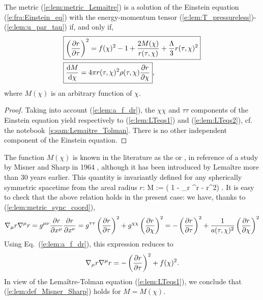 \begin{prop}
The metric (\ref{e:lem:metric_Lemaitre}) is a solution of the
Einstein equation (\ref{e:fra:Einstein_eq}) with the energy-momentum tensor (\ref{e:lem:T_pressureless})-(\ref{e:lem:u_par_tau}) if, and only if,
\begin{subequations}\label{e:lem:LTeqs}
\begin{align}
 & \fbox{$\displaystyle \left( \frac{\partial r}{\partial \tau} \right) ^2 = f(\chi)^2 - 1 + \frac{2M(\chi)}{r(\tau,\chi)}
   + \frac{\Lambda}{3} r(\tau,\chi)^2 $} \label{e:lem:LTeqs1} \\
 & \fbox{$\displaystyle \frac{\mathrm{d} M}{\mathrm{d}\chi} = 4\pi r(\tau,\chi)^2 \rho(\tau,\chi) \frac{\partial r}{\partial \chi} $} ,
    \label{e:lem:LTeqs2}
 \end{align}
\end{subequations}
where $M(\chi)$ is an arbitrary function of $\chi$.
\end{prop}
\begin{proof}
Taking into account (\ref{e:lem:a_f_dr}), the $\chi\chi$ and $\tau\tau$ components of the Einstein equation
yield respectively to (\ref{e:lem:LTeqs1}) and (\ref{e:lem:LTeqs2}), cf. the notebook~\ref{s:sam:Lemaitre_Tolman}.
There is no other independent component of the Einstein equation.
\end{proof}

The function $M(\chi)$ is known in the literature as the  or , in reference
of a study by Misner and Sharp in 1964 \cite{MisneS64}, although it has been introduced
by Lemaître \cite{Lemai32} more than 30 years earlier. This quantity is
invariantly defined for any spherically symmetric spacetime from the areal radius $r$:
\be \label{e:lem:def_Misner_Sharp}
    M  :=  \left( 1 - \nabla_\mu r \nabla^\mu r  -  r^2\right) .
\ee
It is easy to check that the above relation holds in the present case:
we have, thanks to (\ref{e:lem:metric_sync_coord}),
\[
    \nabla_\mu r \nabla^\mu r = g^{\mu\nu} \frac{\partial r}{\partial x^\mu} \frac{\partial r}{\partial x^\nu}
        = g^{\tau\tau} \left( \frac{\partial r}{\partial \tau} \right)^2
        + g^{\chi\chi} \left( \frac{\partial r}{\partial \chi} \right)^2
        = - \left( \frac{\partial r}{\partial \tau} \right)^2 + \frac{1}{a(\tau,\chi)^2} \left( \frac{\partial r}{\partial \chi} \right)^2
\]
Using Eq.~(\ref{e:lem:a_f_dr}), this expression reduces to
\[
    \nabla_\mu r \nabla^\mu r = - \left( \frac{\partial r}{\partial \tau} \right)^2 + f(\chi)^2 .
\]
In view of the Lemaître-Tolman equation (\ref{e:lem:LTeqs1}), we conclude that
(\ref{e:lem:def_Misner_Sharp}) holds for $M = M(\chi)$.

